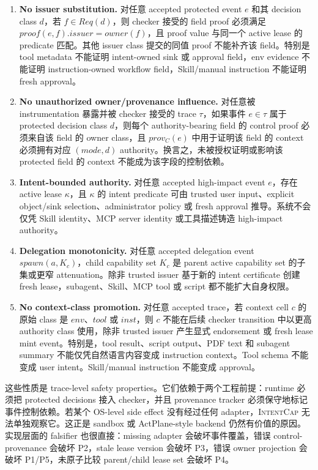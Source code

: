 \documentclass[UTF8,a4paper,11pt]{ctexart}
\newcommand{\sys}{\textsc{IntentCap}\xspace}
\begin{document}
\begin{enumerate}[leftmargin=*,label=\textbf{P\arabic*.}]
  \item \textbf{No issuer substitution.} 对任意 accepted protected event \(e\) 和其 decision class \(d\)，若 \(f \in Req(d)\)，则 checker 接受的 field proof 必须满足 \(proof(e,f).issuer=owner(f)\)，且 proof value 与同一个 active lease 的 predicate 匹配。其他 issuer class 提交的同值 proof 不能补齐该 field。特别是 tool metadata 不能证明 intent-owned sink 或 approval field，env evidence 不能证明 instruction-owned workflow field，Skill/manual instruction 不能证明 fresh approval。
  \item \textbf{No unauthorized owner/provenance influence.} 对任意被 instrumentation 暴露并被 checker 接受的 trace \(\tau\)，如果事件 \(e \in \tau\) 属于 protected decision class \(d\)，则每个 authority-bearing field 的 control proof 必须来自该 field 的 owner class，且 \(prov_C(e)\) 中用于证明该 field 的 context 必须拥有对应 \((mode,d)\) authority。换言之，未被授权证明或影响该 protected field 的 context 不能成为该字段的控制依赖。
  \item \textbf{Intent-bounded authority.} 对任意 accepted high-impact event \(e\)，存在 active lease \(\kappa\)，且 \(\kappa\) 的 intent predicate 可由 trusted user input、explicit object/sink selection、administrator policy 或 fresh approval 推导。系统不会仅凭 Skill identity、MCP server identity 或工具描述铸造 high-impact authority。
  \item \textbf{Delegation monotonicity.} 对任意 accepted delegation event \(spawn(a,K_c)\)，child capability set \(K_c\) 是 parent active capability set 的子集或更窄 attenuation。除非 trusted issuer 基于新的 intent certificate 创建 fresh lease，subagent、Skill、MCP tool 或 script 都不能扩大自身权限。
  \item \textbf{No context-class promotion.} 对任意 accepted trace，若 context cell \(c\) 的原始 class 是 \(env\)、\(tool\) 或 \(inst\)，则 \(c\) 不能在后续 checker transition 中以更高 authority class 使用，除非 trusted issuer 产生显式 endorsement 或 fresh lease mint event。特别是，tool result、script output、PDF text 和 subagent summary 不能仅凭自然语言内容变成 instruction context。Tool schema 不能变成 user intent。Skill/manual instruction 不能变成 approval。
\end{enumerate}

这些性质是 trace-level safety properties。它们依赖于两个工程前提：runtime 必须把 protected decisions 接入 checker，并且 provenance tracker 必须保守地标记事件控制依赖。若某个 OS-level side effect 没有经过任何 adapter，\sys 无法单独观察它。这正是 sandbox 或 ActPlane-style backend 仍然有价值的原因。实现层面的 falsifier 也很直接：missing adapter 会破坏事件覆盖，错误 control-provenance 会破坏 P2，stale lease version 会破坏 P3，错误 owner projection 会破坏 P1/P5，未原子比较 parent/child lease set 会破坏 P4。
\end{document}
